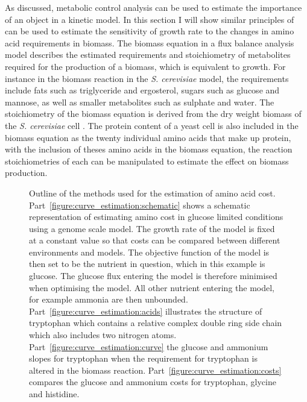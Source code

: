 As discussed, metabolic control analysis can be used to estimate the importance of an object in a kinetic model. In this section I will show similar principles of can be used to estimate the sensitivity of growth rate to the changes in amino acid requirements in biomass. The biomass equation in a flux balance analysis model describes the estimated requirements and stoichiometry of metabolites required for the production of a biomass, which is equivalent to growth. For instance in the biomass reaction in the \emph{S. cerevisiae} model, the requirements include fats such as triglyceride and ergosterol, sugars such as glucose and mannose, as well as smaller metabolites such as sulphate and water. The stoichiometry of the biomass equation is derived from the dry weight biomass of the \emph{S. cerevisiae} cell \cite{duarte2004a}. The protein content of a yeast cell is also included in the biomass equation as the twenty individual amino acids that make up protein, with the inclusion of theses amino acids in the biomass equation, the reaction stoichiometries of each can be manipulated to estimate the effect on biomass production.

\begin{figure}
  \hfill
  \hfill
  \hfill
  \hfill
  \label{figure:curve_estimation}
  \caption[Methods used for estimation of amino acid cost]{Outline of the methods used for the estimation of amino acid cost. Part~\ref{figure:curve_estimation:schematic} shows a schematic representation of estimating amino cost in glucose limited conditions using a genome scale model. The growth rate of the model is fixed at a constant value so that costs can be compared  between different environments and models. The objective function of the model is then set to be the nutrient in question, which in this example is glucose. The glucose flux entering the model is therefore minimised when optimising the model. All other nutrient entering the model, for example ammonia are then unbounded. Part~\ref{figure:curve_estimation:acids} illustrates the structure of tryptophan which contains a relative complex double ring side chain which also includes two nitrogen atoms. Part~\ref{figure:curve_estimation:curve} the glucose and ammonium slopes for tryptophan when the requirement for tryptophan is altered in the biomass reaction. Part~\ref{figure:curve_estimation:costs} compares the glucose and ammonium costs for tryptophan, glycine and histidine. }
\end{figure}

